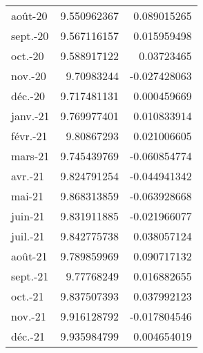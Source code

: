 \begin{tabular}{@{}lrr@{}}
    août-20                  & 9.550962367                       & 0.089015265                       \\
    sept.-20                 & 9.567116157                       & 0.015959498                       \\
    oct.-20                  & 9.588917122                       & 0.03723465                        \\
    nov.-20                  & 9.70983244                        & -0.027428063                      \\
    déc.-20                  & 9.717481131                       & 0.000459669                       \\
    janv.-21                 & 9.769977401                       & 0.010833914                       \\
    févr.-21                 & 9.80867293                        & 0.021006605                       \\
    mars-21                  & 9.745439769                       & -0.060854774                      \\
    avr.-21                  & 9.824791254                       & -0.044941342                      \\
    mai-21                   & 9.868313859                       & -0.063928668                      \\
    juin-21                  & 9.831911885                       & -0.021966077                      \\
    juil.-21                 & 9.842775738                       & 0.038057124                       \\
    août-21                  & 9.789859969                       & 0.090717132                       \\
    sept.-21                 & 9.77768249                        & 0.016882655                       \\
    oct.-21                  & 9.837507393                       & 0.037992123                       \\
    nov.-21                  & 9.916128792                       & -0.017804546                      \\
    déc.-21                  & 9.935984799                       & 0.004654019                       \\ \bottomrule
\end{tabular}

